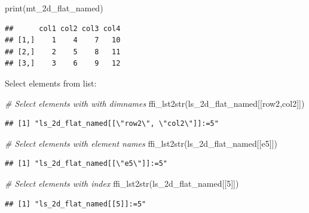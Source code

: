 \documentclass[
]{book}
\newenvironment{Shaded}{\begin{snugshade}}{\end{snugshade}}
\newcommand{\CommentTok}[1]{\textcolor[rgb]{0.56,0.35,0.01}{\textit{#1}}}
\newcommand{\DecValTok}[1]{\textcolor[rgb]{0.00,0.00,0.81}{#1}}
\newcommand{\FunctionTok}[1]{\textcolor[rgb]{0.00,0.00,0.00}{#1}}
\newcommand{\NormalTok}[1]{#1}
\newcommand{\StringTok}[1]{\textcolor[rgb]{0.31,0.60,0.02}{#1}}
\begin{document}
\begin{Shaded}
\begin{Highlighting}[]
\FunctionTok{print}\NormalTok{(mt\_2d\_flat\_named)}
\end{Highlighting}
\end{Shaded}

\begin{verbatim}
##      col1 col2 col3 col4
## [1,]    1    4    7   10
## [2,]    2    5    8   11
## [3,]    3    6    9   12
\end{verbatim}

Select elements from list:

\begin{Shaded}
\begin{Highlighting}[]
\CommentTok{\# Select elements with with dimnames}
\FunctionTok{ffi\_lst2str}\NormalTok{(ls\_2d\_flat\_named[[}\StringTok{\textquotesingle{}row2\textquotesingle{}}\NormalTok{,}\StringTok{\textquotesingle{}col2\textquotesingle{}}\NormalTok{]])}
\end{Highlighting}
\end{Shaded}

\begin{verbatim}
## [1] "ls_2d_flat_named[[\"row2\", \"col2\"]]:=5"
\end{verbatim}

\begin{Shaded}
\begin{Highlighting}[]
\CommentTok{\# Select elements with element names}
\FunctionTok{ffi\_lst2str}\NormalTok{(ls\_2d\_flat\_named[[}\StringTok{\textquotesingle{}e5\textquotesingle{}}\NormalTok{]])}
\end{Highlighting}
\end{Shaded}

\begin{verbatim}
## [1] "ls_2d_flat_named[[\"e5\"]]:=5"
\end{verbatim}

\begin{Shaded}
\begin{Highlighting}[]
\CommentTok{\# Select elements with index}
\FunctionTok{ffi\_lst2str}\NormalTok{(ls\_2d\_flat\_named[[}\DecValTok{5}\NormalTok{]])}
\end{Highlighting}
\end{Shaded}

\begin{verbatim}
## [1] "ls_2d_flat_named[[5]]:=5"
\end{verbatim}
\end{document}
